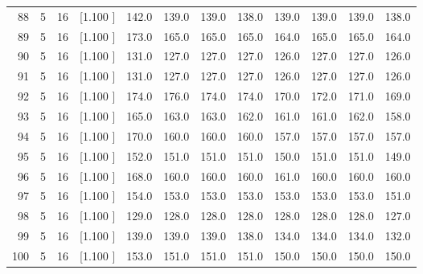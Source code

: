 \documentclass[12pt,a4paper]{article}
\begin{document}
\begin{center}
{\begin{tabular}{r r r r r r r r r r r r}
  88&  5& 16&[1.100     ]&   142.0&   139.0&   139.0&   138.0&   139.0&   139.0&   139.0&   138.0\\[-0.02in]
  89&  5& 16&[1.100     ]&   173.0&   165.0&   165.0&   165.0&   164.0&   165.0&   165.0&   164.0\\[-0.02in]
  90&  5& 16&[1.100     ]&   131.0&   127.0&   127.0&   127.0&   126.0&   127.0&   127.0&   126.0\\[-0.02in]
  91&  5& 16&[1.100     ]&   131.0&   127.0&   127.0&   127.0&   126.0&   127.0&   127.0&   126.0\\[-0.02in]
  92&  5& 16&[1.100     ]&   174.0&   176.0&   174.0&   174.0&   170.0&   172.0&   171.0&   169.0\\[-0.02in]
  93&  5& 16&[1.100     ]&   165.0&   163.0&   163.0&   162.0&   161.0&   161.0&   162.0&   158.0\\[-0.02in]
  94&  5& 16&[1.100     ]&   170.0&   160.0&   160.0&   160.0&   157.0&   157.0&   157.0&   157.0\\[-0.02in]
  95&  5& 16&[1.100     ]&   152.0&   151.0&   151.0&   151.0&   150.0&   151.0&   151.0&   149.0\\[-0.02in]
  96&  5& 16&[1.100     ]&   168.0&   160.0&   160.0&   160.0&   161.0&   160.0&   160.0&   160.0\\[-0.02in]
  97&  5& 16&[1.100     ]&   154.0&   153.0&   153.0&   153.0&   153.0&   153.0&   153.0&   151.0\\[-0.02in]
  98&  5& 16&[1.100     ]&   129.0&   128.0&   128.0&   128.0&   128.0&   128.0&   128.0&   127.0\\[-0.02in]
  99&  5& 16&[1.100     ]&   139.0&   139.0&   139.0&   138.0&   134.0&   134.0&   134.0&   132.0\\[-0.02in]
 100&  5& 16&[1.100     ]&   153.0&   151.0&   151.0&   151.0&   150.0&   150.0&   150.0&   150.0\\[-0.02in]

\hline
\end{tabular}}
\end{center}
\end{document}
